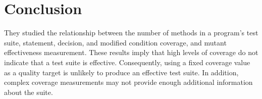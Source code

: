 \section{Conclusion}
They studied the relationship between the number of methods in a program’s test suite, statement, decision, and modified condition coverage, and mutant effectiveness measurement. These results imply that high levels of coverage do not indicate that a test suite is effective. Consequently, using a fixed coverage value as a quality target is unlikely to produce an effective test suite. In addition, complex coverage measurements may not provide enough additional information about the suite.